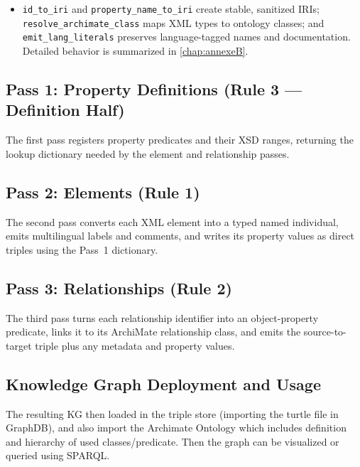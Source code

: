 \begin{itemize}
    \item \texttt{id\_to\_iri} and \texttt{property\_name\_to\_iri} create stable, sanitized IRIs; \texttt{resolve\_archimate\_class} maps XML types to ontology classes; and \texttt{emit\_lang\_literals} preserves language-tagged names and documentation. Detailed behavior is summarized in \autoref{chap:annexeB}.
\end{itemize}

\subsection{Pass 1: Property Definitions (Rule 3 --- Definition Half)}
\label{subsec:pass1}

The first pass registers property predicates and their XSD ranges, returning the lookup dictionary needed by the element and relationship passes.

\subsection{Pass 2: Elements (Rule 1)}
\label{subsec:pass2}

The second pass converts each XML element into a typed named individual, emits multilingual labels and comments, and writes its property values as direct triples using the Pass~1 dictionary.

\subsection{Pass 3: Relationships (Rule 2)}
\label{subsec:pass3}

The third pass turns each relationship identifier into an object-property predicate, links it to its ArchiMate relationship class, and emits the source-to-target triple plus any metadata and property values.

\subsection{Knowledge Graph Deployment and Usage}
\label{subsec:kg-deployment-usage}

The resulting KG then loaded in the triple store (importing the turtle file in GraphDB), and also import the Archimate Ontology which includes definition and hierarchy of used classes/predicate. Then the graph can be visualized or queried using SPARQL.

